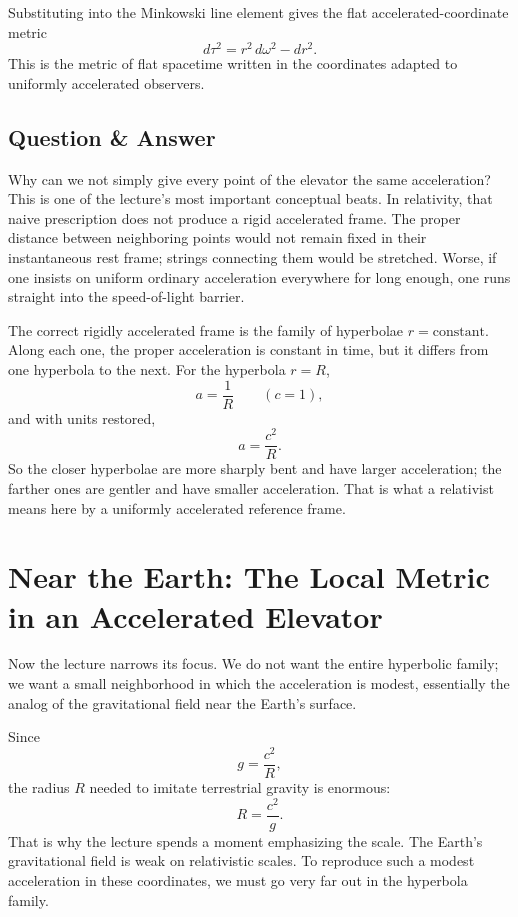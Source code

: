 Substituting into the Minkowski line element gives the flat accelerated-coordinate metric
\begin{equation}
d\tau^2=r^2\,d\omega^2-dr^2.
\end{equation}
This is the metric of flat spacetime written in the coordinates adapted to uniformly accelerated observers.

\subsection{Question \& Answer}

Why can we not simply give every point of the elevator the same acceleration? This is one of the lecture's most important conceptual beats. In relativity, that naive prescription does not produce a rigid accelerated frame. The proper distance between neighboring points would not remain fixed in their instantaneous rest frame; strings connecting them would be stretched. Worse, if one insists on uniform ordinary acceleration everywhere for long enough, one runs straight into the speed-of-light barrier.

The correct rigidly accelerated frame is the family of hyperbolae \(r=\text{constant}\). Along each one, the proper acceleration is constant in time, but it differs from one hyperbola to the next. For the hyperbola \(r=R\),
\begin{equation}
a=\frac{1}{R}
\qquad
(c=1),
\end{equation}
and with units restored,
\begin{equation}
a=\frac{c^2}{R}.
\end{equation}
So the closer hyperbolae are more sharply bent and have larger acceleration; the farther ones are gentler and have smaller acceleration. That is what a relativist means here by a uniformly accelerated reference frame.

\section{Near the Earth: The Local Metric in an Accelerated Elevator}

Now the lecture narrows its focus. We do not want the entire hyperbolic family; we want a small neighborhood in which the acceleration is modest, essentially the analog of the gravitational field near the Earth's surface.

Since
\begin{equation}
g=\frac{c^2}{R},
\end{equation}
the radius \(R\) needed to imitate terrestrial gravity is enormous:
\begin{equation}
R=\frac{c^2}{g}.
\end{equation}
That is why the lecture spends a moment emphasizing the scale. The Earth's gravitational field is weak on relativistic scales. To reproduce such a modest acceleration in these coordinates, we must go very far out in the hyperbola family.

